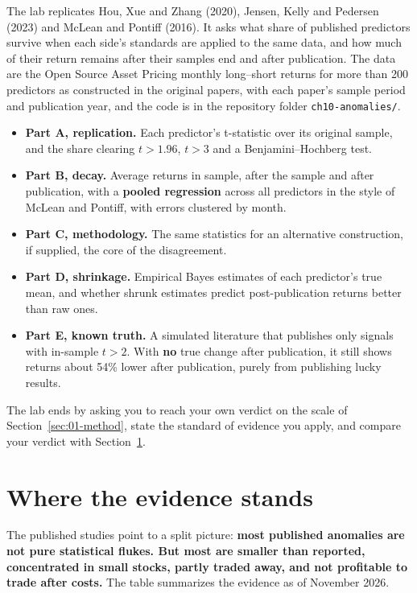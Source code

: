 The lab replicates Hou, Xue and Zhang (2020), Jensen, Kelly and Pedersen (2023) and McLean and Pontiff (2016). It asks what share of published predictors survive when each side's standards are applied to the same data, and how much of their return remains after their samples end and after publication. The data are the Open Source Asset Pricing monthly long--short returns for more than 200 predictors as constructed in the original papers, with each paper's sample period and publication year, and the code is in the repository folder \texttt{ch10-anomalies/}.

\begin{itemize}
  \item \textbf{Part A, replication.} Each predictor's t-statistic over its original sample, and the share clearing $t > 1.96$, $t > 3$ and a Benjamini--Hochberg test.
  \item \textbf{Part B, decay.} Average returns in sample, after the sample and after publication, with a \textbf{pooled regression} across all predictors in the style of McLean and Pontiff, with errors clustered by month.
  \item \textbf{Part C, methodology.} The same statistics for an alternative construction, if supplied, the core of the disagreement.
  \item \textbf{Part D, shrinkage.} Empirical Bayes estimates of each predictor's true mean, and whether shrunk estimates predict post-publication returns better than raw ones.
  \item \textbf{Part E, known truth.} A simulated literature that publishes only signals with in-sample $t > 2$. With \textbf{no} true change after publication, it still shows returns about 54\% lower after publication, purely from publishing lucky results.
\end{itemize}

The lab ends by asking you to reach your own verdict on the scale of Section~\ref{sec:01-method}, state the standard of evidence you apply, and compare your verdict with Section~\ref{sec:19-verdict}.

\section{Where the evidence stands}
\label{sec:19-verdict}

The published studies point to a split picture: \textbf{most published anomalies are not pure statistical flukes. But most are smaller than reported, concentrated in small stocks, partly traded away, and not profitable to trade after costs.} The table summarizes the evidence as of November 2026.

